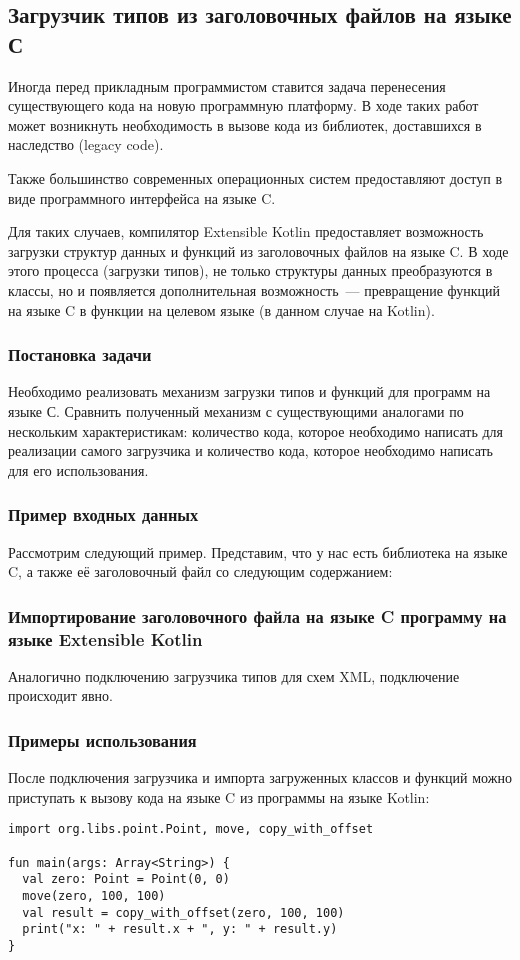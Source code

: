 \subsection{Загрузчик типов из заголовочных файлов на языке С}\label{c-loader}
Иногда перед прикладным программистом ставится задача перенесения существующего кода на новую программную платформу.
В ходе таких работ может возникнуть необходимость в вызове кода из библиотек, доставшихся в наследство (legacy code).

Также большинство современных операционных систем предоставляют доступ в виде программного интерфейса на языке C.

Для таких случаев, компилятор Extensible Kotlin предоставляет возможность загрузки структур данных и функций из заголовочных файлов на языке C.
В ходе этого процесса (загрузки типов), не только структуры данных преобразуются в классы, но и появляется дополнительная возможность~--- превращение функций на языке C в функции на целевом языке (в данном случае на Kotlin).

\subsubsection{Постановка задачи}
\td Необходимо реализовать механизм загрузки типов и функций для программ на языке С. Сравнить полученный механизм с существующими аналогами по нескольким характеристикам: количество кода, которое необходимо написать для реализации самого загрузчика и количество кода, которое необходимо написать для его использования.

\subsubsection{Пример входных данных}
Рассмотрим следующий пример. Представим, что у нас есть библиотека на языке C, а также её заголовочный файл со следующим содержанием:


\subsubsection{Импортирование заголовочного файла на языке C программу на языке Extensible Kotlin}
Аналогично подключению загрузчика типов для схем XML, подключение происходит явно. \td

\subsubsection{Примеры использования}
После подключения загрузчика и импорта загруженных классов и функций можно приступать к вызову кода на языке C из программы на языке Kotlin:
\begin{lstlisting}[caption={Пример работы с функциями и структурами данных, загруженных из заголовочного файла~\ref{point-h-example}.}, label=point-example]
import org.libs.point.Point, move, copy_with_offset

fun main(args: Array<String>) {
  val zero: Point = Point(0, 0)
  move(zero, 100, 100)
  val result = copy_with_offset(zero, 100, 100)
  print("x: " + result.x + ", y: " + result.y)
}
\end{lstlisting}
